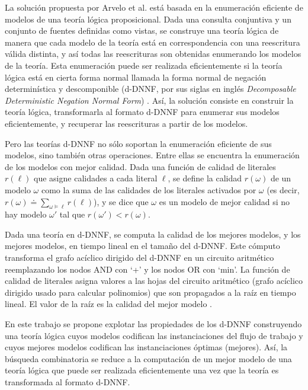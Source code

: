 La solución propuesta por Arvelo et al. \cite{arvelo:aaai06} está basada en la enumeración
eficiente de modelos de una teoría lógica proposicional. Dada una consulta conjuntiva
y un conjunto de fuentes definidas como vistas, se construye una teoría
lógica de manera que cada modelo de la teoría está en correspondencia con una
reescritura válida distinta, y así todas las reescrituras son obtenidas enumerando los
modelos de la teoría. Esta enumeración puede ser realizada eficientemente si la
teoría lógica está en cierta forma normal llamada la forma normal de negación
determinística y descomponible (d-DNNF, por sus siglas en inglés \emph{Decomposable Deterministic Negation Normal Form}) \cite{darwiche:d-dnnfs}. Así,
la solución consiste en construir la teoría lógica, transformarla al formato d-DNNF para
enumerar sus modelos eficientemente, y recuperar las reescrituras a partir de los modelos.

Pero las teorías d-DNNF no sólo soportan la enumeración eficiente de sus
modelos, sino también otras operaciones. Entre ellas se encuentra la enumeración
de los modelos con mejor calidad. Dada una función de calidad de literales
$r(\ell)$ que asigne calidades a cada literal $\ell$, se define la calidad
$r(\omega)$ de un modelo $\omega$ como la suma de las calidades de los literales
activados por $\omega$ (es decir,
$r(\omega)\doteq\sum_{\omega\vDash\ell}r(\ell)$), y se dice que $\omega$ es un modelo
de mejor calidad si no hay modelo $\omega'$ tal que $r(\omega')<r(\omega)$.

Dada una teoría en d-DNNF, se computa la calidad de los mejores modelos, y
los mejores modelos, en tiempo lineal en el tamaño del d-DNNF. Este cómputo
transforma el grafo acíclico dirigido del d-DNNF en un circuito aritmético reemplazando los nodos
AND con `+' y los nodos OR con `min'. La función de calidad de literales
asigna valores a las hojas del circuito aritmético (grafo acíclico dirigido usado
para calcular polinomios) que son propagados a la raíz en tiempo
lineal. El valor de la raíz es la calidad del mejor modelo \cite{darwiche:weighted}.

En este trabajo se propone explotar las propiedades de los d-DNNF construyendo una
teoría lógica cuyos modelos codifican las instanciaciones del flujo de trabajo
y cuyos mejores modelos codifican las instanciaciones óptimas (mejores). Así, la
búsqueda combinatoria se reduce a la computación de un mejor modelo de una
teoría lógica que puede ser realizada eficientemente una vez que la teoría es
transformada al formato d-DNNF.

